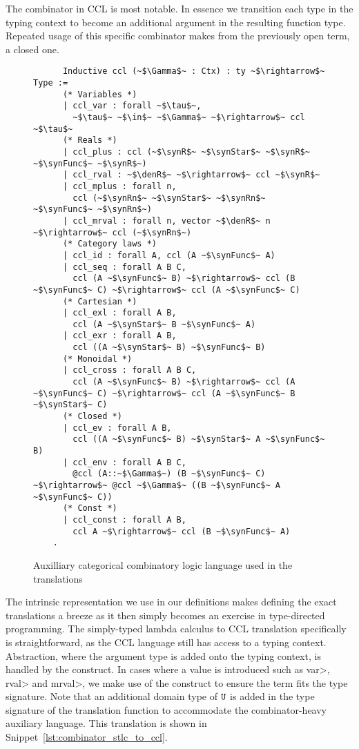   The \cclenv combinator in CCL is most notable.
  In essence we transition each type in the typing context to become an additional argument in the resulting function type.
  Repeated usage of this specific combinator makes from the previously open term, a closed one.

  \begin{figure}[]
    \centering
    \begin{verbatim}
      Inductive ccl (~$\Gamma$~ : Ctx) : ty ~$\rightarrow$~ Type :=
      (* Variables *)
      | ccl_var : forall ~$\tau$~,
        ~$\tau$~ ~$\in$~ ~$\Gamma$~ ~$\rightarrow$~ ccl ~$\tau$~
      (* Reals *)
      | ccl_plus : ccl (~$\synR$~ ~$\synStar$~ ~$\synR$~ ~$\synFunc$~ ~$\synR$~)
      | ccl_rval : ~$\denR$~ ~$\rightarrow$~ ccl ~$\synR$~
      | ccl_mplus : forall n,
        ccl (~$\synRn$~ ~$\synStar$~ ~$\synRn$~ ~$\synFunc$~ ~$\synRn$~)
      | ccl_mrval : forall n, vector ~$\denR$~ n ~$\rightarrow$~ ccl (~$\synRn$~)
      (* Category laws *)
      | ccl_id : forall A, ccl (A ~$\synFunc$~ A)
      | ccl_seq : forall A B C,
        ccl (A ~$\synFunc$~ B) ~$\rightarrow$~ ccl (B ~$\synFunc$~ C) ~$\rightarrow$~ ccl (A ~$\synFunc$~ C)
      (* Cartesian *)
      | ccl_exl : forall A B,
        ccl (A ~$\synStar$~ B ~$\synFunc$~ A)
      | ccl_exr : forall A B,
        ccl ((A ~$\synStar$~ B) ~$\synFunc$~ B)
      (* Monoidal *)
      | ccl_cross : forall A B C,
        ccl (A ~$\synFunc$~ B) ~$\rightarrow$~ ccl (A ~$\synFunc$~ C) ~$\rightarrow$~ ccl (A ~$\synFunc$~ B ~$\synStar$~ C)
      (* Closed *)
      | ccl_ev : forall A B,
        ccl ((A ~$\synFunc$~ B) ~$\synStar$~ A ~$\synFunc$~ B)
      | ccl_env : forall A B C,
        @ccl (A::~$\Gamma$~) (B ~$\synFunc$~ C) ~$\rightarrow$~ @ccl ~$\Gamma$~ ((B ~$\synFunc$~ A ~$\synFunc$~ C))
      (* Const *)
      | ccl_const : forall A B,
        ccl A ~$\rightarrow$~ ccl (B ~$\synFunc$~ A)
    .
    \end{verbatim}
    \caption{Auxilliary categorical combinatory logic language used in the translations}
    \label{fig:combinator_ccl_lang}
  \end{figure}

  The intrinsic representation we use in our definitions makes defining the exact translations a breeze as it then simply becomes an exercise in type-directed programming.
  The simply-typed lambda calculus to CCL translation specifically is straightforward, as the CCL language still has access to a typing context.
  Abstraction, where the argument type is added onto the typing context, is handled by the \cclenv construct.
  In cases where a value is introduced such as \<var>, \<rval> and \<mrval>, we make use of the \cclconst construct to ensure the term fits the type signature.
  Note that an additional domain type of $\texttt{U}$ is added in the type signature of the translation function to accommodate the combinator-heavy auxiliary language.
  This translation is shown in Snippet~\ref{lst:combinator_stlc_to_ccl}.

